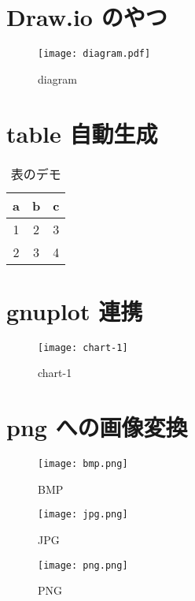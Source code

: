 \documentclass[uplatex,dvipdfmx,titlepage,a4j]{jsarticle}
\begin{document}
\section{Draw.io のやつ}

\begin{figure}[h]
  \centering
  \texttt{[image: diagram.pdf]}
  \caption{diagram} \label{fig: diagram}
\end{figure}

\section{table 自動生成}

\begin{table}[hbtp]
  \caption{表のデモ} \label{tab: 表のデモ}
  \centering
  \renewcommand{\arraystretch}{0.7}
  \begin{tabular}{ccc}

\hline
a & b & c \\
\hline
1 & 2 & 3 \\
2 & 3 & 4 \\
    \hline
  \end{tabular}
\end{table}

%

\section{gnuplot 連携}

\begin{figure}[h]
  \centering
  \texttt{[image: chart-1]}
  \caption{chart-1} \label{fig: chart-1}
\end{figure}

\section{png への画像変換}

\begin{figure}[h]
  \centering

  \begin{minipage}{0.3\textwidth}
    \centering
    \texttt{[image: bmp.png]}
    \caption{BMP} \label{fig: bmp.png}
  \end{minipage}

  \begin{minipage}{0.3\textwidth}
    \centering
    \texttt{[image: jpg.png]}
    \caption{JPG} \label{fig: jpg.png}
  \end{minipage}

  \begin{minipage}{0.3\textwidth}
    \centering
    \texttt{[image: png.png]}
    \caption{PNG} \label{fig: png.png}
  \end{minipage}

\end{figure}


\begin{thebibliography}{99}
\end{thebibliography}
\end{document}
